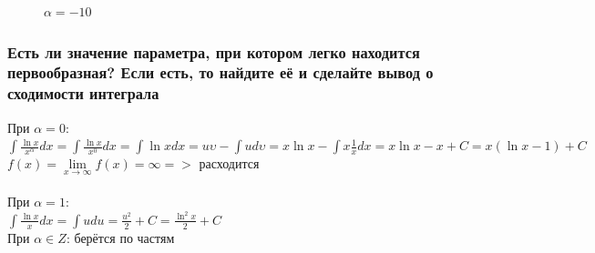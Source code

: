 \documentclass{article}
\begin{document}
\begin{figure}[h!]
\caption*{$ \alpha = -10 $}
\end{figure}
\subsubsection{Есть ли значение параметра, при котором легко находится первообразная? Если есть, то найдите её и сделайте вывод о сходимости интеграла}
При $ \alpha = 0 $:\\
\large
$ \int\limits \frac{\ln{x}}{x^{\alpha}}dx = \int\limits \frac{\ln{x}}{x^0}dx = \int\limits \ln{x}dx = u\upsilon - \int\limits ud\upsilon = x\ln{x} - \int\limits x\frac{1}{x}dx = x\ln{x} - x + C = x(\ln{x} - 1) + C $\\
$ f(x) = \lim\limits_{x\to \infty} f(x) = \infty => $ расходится\\\\
\normalsize
При $ \alpha = 1 $:\\
\large
$ \int\limits \frac{\ln{x}}{x}dx = \int\limits udu = \frac{u^2}{2} + C = \frac{\ln^2{x}}{2} + C $\\
\normalsize
При $ \alpha \in Z $: берётся по частям
\end{document}
